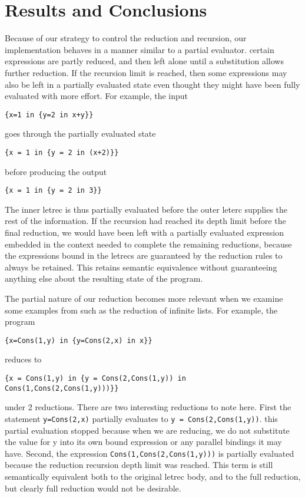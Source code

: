 \documentclass[preprint, 10pt]{sigplanconf}
\begin{document}
\section{Results and Conclusions}
Because of our strategy to control the reduction and recursion, our implementation behaves in a manner similar to a partial evaluator.  certain expressions are partly reduced, and then left alone until a substitution allows further reduction.  If the recursion limit is reached, then some expressions may also be left in a partially evaluated state even thought they might have been fully evaluated with more effort. For example, the input 
\begin{verbatim}
{x=1 in {y=2 in x+y}}
\end{verbatim}
goes through the partially evaluated state
\begin{verbatim}
{x = 1 in {y = 2 in (x+2)}}
\end{verbatim}
before producing the output
\begin{verbatim}
{x = 1 in {y = 2 in 3}}
\end{verbatim}
The inner letrec is thus partially evaluated before the outer leterc supplies the rest of the information.  If the recursion had reached its depth limit before the final  reduction, we would have been left with a partially evaluated expression embedded in the context needed to complete the remaining reductions, because the expressions bound in the letrecs are guaranteed by the reduction rules to always be retained. This retains semantic equivalence without guaranteeing anything else about the resulting state of the program.

The  partial nature of our reduction becomes more relevant when we examine some examples from \cite{lambdas} such as the reduction of infinite lists.  For example, the program
\begin{verbatim}
{x=Cons(1,y) in {y=Cons(2,x) in x}}
\end{verbatim}
reduces to 
\begin{verbatim}
{x = Cons(1,y) in {y = Cons(2,Cons(1,y)) in 
Cons(1,Cons(2,Cons(1,y)))}}
\end{verbatim}

under 2 reductions.  There are two interesting reductions to note here. First the statement \verb#y=Cons(2,x)# partially evaluates to \verb#y = Cons(2,Cons(1,y))#.  this partial evaluation stopped because when we are reducing, we do not substitute the value for y into its own bound expression or any parallel bindings it may have.  Second, the expression \verb#Cons(1,Cons(2,Cons(1,y)))# is partially evaluated because the reduction recursion depth limit was reached. This term is still semantically equivalent both to the original letrec body, and to the full reduction, but clearly  full reduction would not be desirable.
\end{document}
